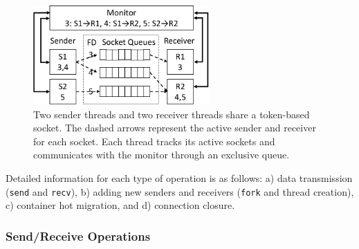 \begin{figure}[htbp]
	\centering
	\includegraphics[width=0.6\textwidth]{images/queue_arch}
	\caption{Two sender threads and two receiver threads share a token-based socket. The dashed arrows represent the active sender and receiver for each socket. Each thread tracks its active sockets and communicates with the monitor through an exclusive queue.}
	\label{socksdirect:fig:queue-arch}
\end{figure}


Detailed information for each type of operation is as follows: a) data transmission (\texttt{send} and \texttt{recv}), b) adding new senders and receivers (\texttt{fork} and thread creation), c) container hot migration, and d) connection closure.

\subsubsection{Send/Receive Operations}
\label{socksdirect:subsubsec:fork_rdwr}

